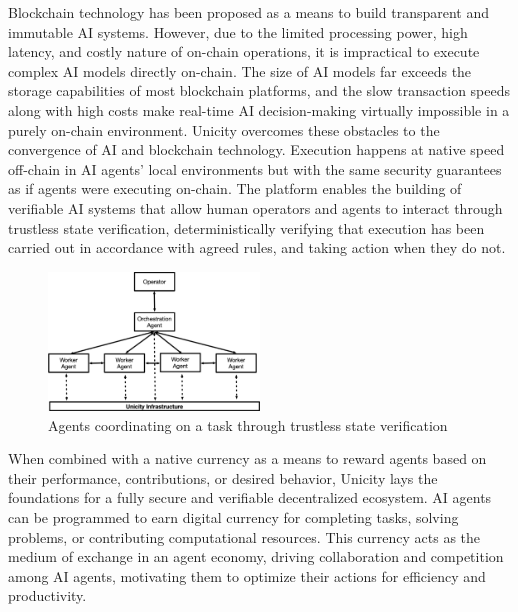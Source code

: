 \documentclass{article}
\begin{document}
\vspace{2mm}

Blockchain technology has been proposed as a means to build transparent and immutable AI systems. However, due to the limited processing power, high latency, and costly nature of on-chain operations, it is impractical to execute complex AI models directly on-chain. The size of AI models far exceeds the storage capabilities of most blockchain platforms, and the slow transaction speeds along with high costs make real-time AI decision-making virtually impossible in a purely on-chain environment. Unicity overcomes these obstacles to the convergence of AI and blockchain technology. Execution happens at native speed off-chain in AI agents' local environments but with the same security guarantees as if agents were executing on-chain. The platform enables the building of verifiable AI systems that allow human operators and agents to interact through trustless state verification, deterministically verifying that execution has been carried out in accordance with agreed rules, and taking action when they do not.


\begin{figure}[H]
    \centering
    \includegraphics[width=0.5\textwidth]{AI.png}
    \caption{Agents coordinating on a task through trustless state verification }
    \label{fig:ai}
\end{figure}



When combined with a native currency as a means to reward agents based on their performance, contributions, or desired behavior, Unicity lays the foundations for a fully secure and verifiable decentralized ecosystem. AI agents can be programmed to earn digital currency for completing tasks, solving problems, or contributing computational resources. This currency acts as the medium of exchange in an agent economy, driving collaboration and competition among AI agents, motivating them to optimize their actions for efficiency and productivity.
\vspace{2mm}
\end{document}
